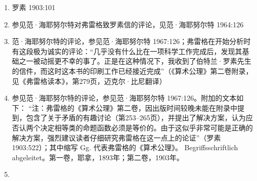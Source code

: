 \begin{enumerate}
\item 罗素 1903:101  
\item 参见范·海耶努尔特对弗雷格致罗素信的评论，见范·海耶努尔特 1964:126  
\item 范·海耶努尔特的评论，参见范·海耶努尔特 1967:126；弗雷格在开始分析时有这段极为诚实的评论：“几乎没有什么比在一项科学工作完成后，发现其基础之一被动摇更不幸的事了。正是在这种情况下，我收到了伯特兰·罗素先生的信件，而这时这本书的印刷工作已经接近完成”（《算术公理》第二卷附录，见《弗雷格读本》，第279页，迈克尔·比尼翻译）
\item 参见范·海耶努尔特的评论，参见范·海耶努尔特 1967:126。附加的文本如下：
“注：弗雷格的《算术公理》第二卷，因出版时间较晚未能在附录中提到，包含了关于矛盾的有趣讨论（第253–265页），并提出了解决方案，认为应否认两个决定相等类的命题函数必须是等价的。由于这似乎非常可能是正确的解决方案，强烈建议读者仔细研究弗雷格在这一点上的论证”（罗素 1903:522）；其中缩写 Gg. 代表弗雷格的《算术公理》。 Begriffsschriftlich abgeleitet。第一卷，耶拿，1893年；第二卷，1903年。
\item 
\end{enumerate}